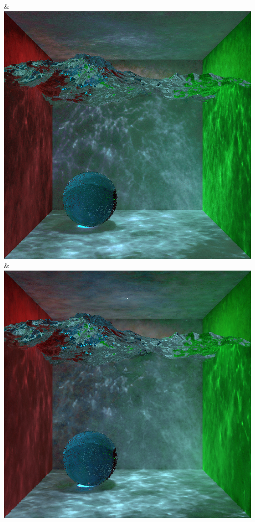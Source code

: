& \includegraphics[width=\linewidth]{figures/py/tests/sppc_optimization/nrc+sppc14@1_1spp_caustics_small.png}
& \includegraphics[width=\linewidth]{figures/py/tests/sppc_optimization/nrc+sppc14@4_1spp_caustics_small.png}
